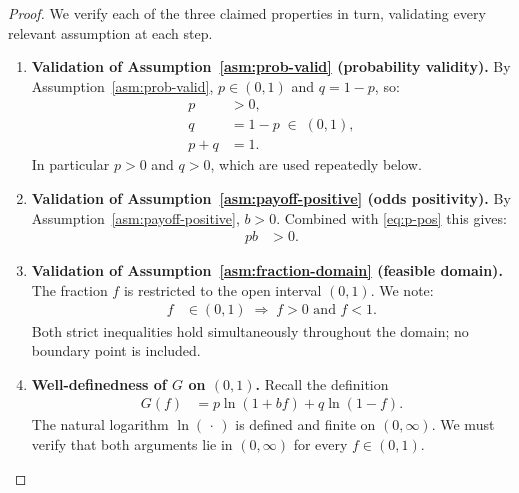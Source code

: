 \documentclass[12pt,openany]{book}
\numberwithin{equation}{chapter}
\theoremstyle{plain}
\theoremstyle{definition}
\theoremstyle{remark}
\numberwithin{equation}{chapter}
\theoremstyle{plain}
\begin{document}
\begin{proof}
We verify each of the three claimed properties in turn, validating
every relevant assumption at each step.

\begin{enumerate}[label=\textbf{Step \arabic*.}, leftmargin=*, widest=Step 9]

  \item \textbf{Validation of Assumption~\ref{asm:prob-valid}
        (probability validity).}
        By Assumption~\ref{asm:prob-valid}, $p \in (0,1)$ and
        $q = 1 - p$, so:
        \begin{align}
          p   &> 0,                        \label{eq:p-pos} \\
          q   &= 1 - p \;\in\; (0,1),     \label{eq:q-pos} \\
          p+q &= 1.                        \label{eq:pq-sum}
        \end{align}
        In particular $p > 0$ and $q > 0$, which are used
        repeatedly below.

  \item \textbf{Validation of Assumption~\ref{asm:payoff-positive}
        (odds positivity).}
        By Assumption~\ref{asm:payoff-positive}, $b > 0$.
        Combined with \eqref{eq:p-pos} this gives:
        \begin{align}
          pb &> 0.  \label{eq:pb-pos}
        \end{align}

  \item \textbf{Validation of Assumption~\ref{asm:fraction-domain}
        (feasible domain).}
        The fraction $f$ is restricted to the open interval
        $(0,1)$.  We note:
        \begin{align}
          f   &\in (0,1)
              \;\Longrightarrow\;
              f > 0 \text{ and } f < 1.
              \label{eq:f-domain}
        \end{align}
        Both strict inequalities hold simultaneously throughout
        the domain; no boundary point is included.

  \item \textbf{Well-definedness of $G$ on $(0,1)$.}
        Recall the definition
        \begin{align}
          G(f) &= p\ln(1 + bf) + q\ln(1 - f).
                 \label{eq:G-def-repeated}
        \end{align}
        The natural logarithm $\ln(\,\cdot\,)$ is defined and
        finite on $(0,\infty)$.  We must verify that both
        arguments lie in $(0,\infty)$ for every $f\in(0,1)$.


\end{enumerate}
\end{proof}
\end{document}
